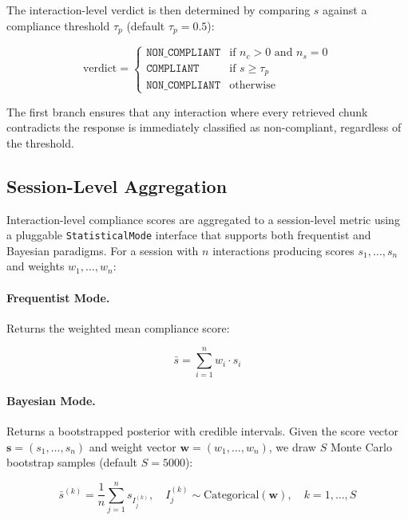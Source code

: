 \documentclass[11pt]{article}
\begin{document}
The interaction-level verdict is then determined by comparing $s$ against a compliance threshold $\tau_p$ (default $\tau_p = 0.5$):

\begin{equation}
    \text{verdict} = \begin{cases}
        \texttt{NON\_COMPLIANT} & \text{if } n_c > 0 \text{ and } n_s = 0 \\
        \texttt{COMPLIANT}      & \text{if } s \geq \tau_p \\
        \texttt{NON\_COMPLIANT} & \text{otherwise}
    \end{cases}
\end{equation}

The first branch ensures that any interaction where every retrieved chunk contradicts the response is immediately classified as non-compliant, regardless of the threshold.

\subsection{Session-Level Aggregation}

Interaction-level compliance scores are aggregated to a session-level metric using a pluggable \texttt{StatisticalMode} interface that supports both frequentist and Bayesian paradigms. For a session with $n$ interactions producing scores $s_1, \ldots, s_n$ and weights $w_1, \ldots, w_n$:

\paragraph{Frequentist Mode.} Returns the weighted mean compliance score:

\begin{equation}
    \bar{s} = \sum_{i=1}^{n} w_i \cdot s_i
\end{equation}

\paragraph{Bayesian Mode.} Returns a bootstrapped posterior with credible intervals. Given the score vector $\mathbf{s} = (s_1, \ldots, s_n)$ and weight vector $\mathbf{w} = (w_1, \ldots, w_n)$, we draw $S$ Monte Carlo bootstrap samples (default $S = 5000$):

\begin{equation}
    \bar{s}^{(k)} = \frac{1}{n} \sum_{j=1}^{n} s_{I_j^{(k)}}, \quad I_j^{(k)} \sim \text{Categorical}(\mathbf{w}), \quad k = 1, \ldots, S
\end{equation}
\end{document}
